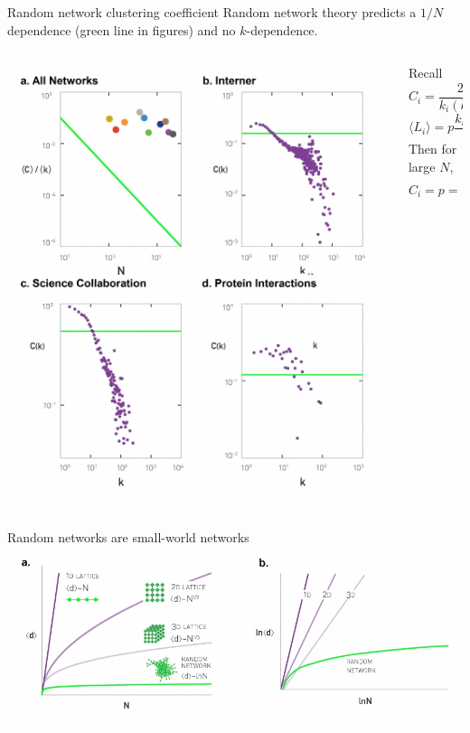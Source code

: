 \documentclass{beamer}
\begin{document}
\begin{frame}{Random network clustering coefficient}
  Random network theory predicts a $1/N$ dependence (green line in figures)
  and no $k$-dependence.
  \begin{columns}
    \begin{column}{.48\textwidth}
      \includegraphics[width=\textwidth]{Figures/realNetworkClusteringNotRandom.jpg} 
    \end{column}
    \begin{column}{.48\textwidth}
      \small
      Recall \[ C_i = \frac{2 \langle L_i \rangle}{k_i(k_i-1)}, \] 
      \[ \langle L_i \rangle = p \frac{k_i(k_i - 1)}{2}. \]
      Then for large $N$, \[ C_i = p = \frac{\langle k \rangle}{N}. \] 
    \end{column}
  \end{columns}
\end{frame}

\begin{frame}{Random networks are small-world networks}
  \centering
  \includegraphics[width=1.1\textwidth]{Figures/randomSmallWorld.jpg} 
\end{frame}
\end{document}
